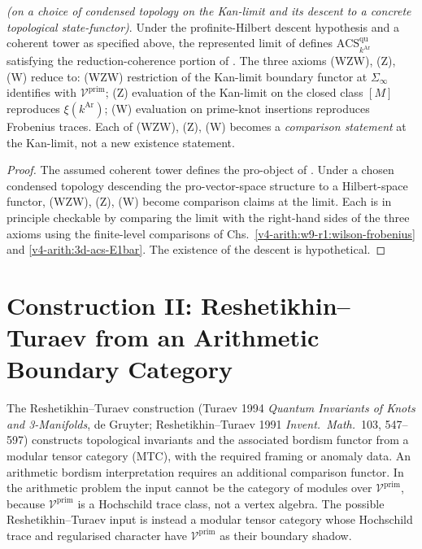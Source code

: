 \begin{theorem}
\label{v4-arith:w10-a:thm:construction-I-closure}
\ClaimStatusProvedHereConditional \emph{(on a choice of condensed
topology on the Kan-limit and its descent to a concrete
topological state-functor)}. Under the profinite-Hilbert descent
hypothesis and a coherent tower as specified above, the represented limit of
 defines
\(\mathrm{ACS}^{\mathrm{qu}}_{k^{\mathrm{Ar}}}\) satisfying the
reduction-coherence portion of
. The three axioms (WZW), (Z),
(W) reduce to: (WZW) restriction of the Kan-limit boundary functor
at \(\Sigma_{\infty}\) identifies with
\(\mathcal V^{\mathrm{prim}}\); (Z) evaluation of the Kan-limit on
the closed class \([M]\) reproduces \(\xi(k^{\mathrm{Ar}})\);
(W) evaluation on prime-knot insertions reproduces Frobenius traces.
Each of (WZW), (Z), (W) becomes a \emph{comparison statement} at the
Kan-limit, not a new existence statement.
\end{theorem}

\begin{proof}
The assumed coherent tower defines the pro-object of
.
Under a chosen condensed topology descending the pro-vector-space
structure to a Hilbert-space functor, (WZW), (Z), (W) become
comparison claims at the limit. Each is in principle checkable by
comparing the limit with the right-hand sides of the three axioms
using the finite-level comparisons of Chs.~\ref{v4-arith:w9-r1:wilson-frobenius}
and \ref{v4-arith:3d-acs-E1bar}. The existence of the descent is
hypothetical.
\end{proof}

\section{Construction II: Reshetikhin--Turaev from an Arithmetic Boundary Category}
\label{v4-arith:w10-a:construction-II}

The Reshetikhin--Turaev construction (Turaev 1994
\emph{Quantum Invariants of Knots and 3-Manifolds}, de Gruyter;
Reshetikhin--Turaev 1991 \emph{Invent.~Math.}~103, 547--597)
constructs topological invariants and the associated bordism functor
from a modular tensor category (MTC), with the required framing or
anomaly data. An arithmetic bordism interpretation requires an
additional comparison functor. In the arithmetic problem the input
cannot be the category of modules over \(\mathcal V^{\mathrm{prim}}\),
because \(\mathcal V^{\mathrm{prim}}\) is a Hochschild trace class, not
a vertex algebra. The possible Reshetikhin--Turaev input is instead a
modular tensor category whose Hochschild trace and regularised
character have \(\mathcal V^{\mathrm{prim}}\) as their boundary shadow.

